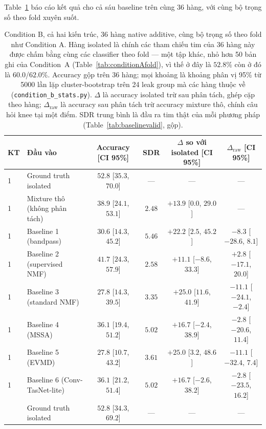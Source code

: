 \documentclass[11pt]{article}
\begin{document}
Table~\ref{tab:conditionb} báo cáo kết quả cho cả sáu baseline trên cùng
36 hàng, với cùng bộ trọng số theo fold xuyên suốt.

\begin{table}[H]
\centering
\caption{Condition B, cả hai kiến trúc, 36 hàng native additive, cùng bộ trọng số theo fold như Condition A. Hàng isolated là chính các tham chiếu tim của 36 hàng này được chấm bằng cùng các classifier theo fold --- một tập khác, nhỏ hơn 50 bản ghi của Condition~A (Table~\ref{tab:conditionAfold}), vì thế ở đây là $52.8\%$ còn ở đó là $60.0$/$62.0\%$. Accuracy gộp trên 36 hàng; mọi khoảng là khoảng phân vị 95\% từ 5000 lần lặp cluster-bootstrap trên 24 leak group mà các hàng thuộc về (\texttt{condition\_b\_stats.py}). $\Delta$ là accuracy isolated trừ sau phân tách, ghép cặp theo hàng; $\Delta_{\text{raw}}$ là accuracy sau phân tách trừ accuracy mixture thô, chính câu hỏi knee tại một điểm. SDR trung bình là đầu ra tim thật của mỗi phương pháp (Table~\ref{tab:baselinevalid}, gộp).}
\label{tab:conditionb}
\small
\begin{tabular}{@{}llcccc@{}}
\toprule
KT & Đầu vào & Accuracy [CI 95\%] & SDR & $\Delta$ so với isolated [CI 95\%] & $\Delta_{\text{raw}}$ [CI 95\%] \\
\midrule
1 & Ground truth isolated & $52.8$ [$35.3$, $70.0$] & --- & --- & --- \\
1 & Mixture thô (không phân tách) & $38.9$ [$24.1$, $53.1$] & $2.48$ & $+13.9$ [$0.0$, $29.0$] & --- \\
1 & Baseline 1 (bandpass) & $30.6$ [$14.3$, $45.2$] & $5.46$ & $+22.2$ [$2.5$, $45.2$] & $-8.3$ [$-28.6$, $8.1$] \\
1 & Baseline 2 (supervised NMF) & $41.7$ [$24.3$, $57.9$] & $2.58$ & $+11.1$ [$-8.6$, $33.3$] & $+2.8$ [$-17.1$, $20.0$] \\
1 & Baseline 3 (standard NMF) & $27.8$ [$14.3$, $39.5$] & $3.35$ & $+25.0$ [$11.6$, $41.9$] & $-11.1$ [$-24.1$, $-2.4$] \\
1 & Baseline 4 (MSSA) & $36.1$ [$19.4$, $51.2$] & $5.02$ & $+16.7$ [$-2.4$, $38.9$] & $-2.8$ [$-20.6$, $11.4$] \\
1 & Baseline 5 (EVMD) & $27.8$ [$10.7$, $43.2$] & $3.61$ & $+25.0$ [$3.2$, $48.6$] & $-11.1$ [$-32.4$, $7.4$] \\
1 & Baseline 6 (Conv-TasNet-lite) & $36.1$ [$21.2$, $51.4$] & $5.02$ & $+16.7$ [$-2.6$, $38.2$] & $-2.8$ [$-23.5$, $16.2$] \\
\addlinespace
2 & Ground truth isolated & $52.8$ [$34.3$, $69.2$] & --- & --- & --- \\

\end{tabular}
\end{table}
\end{document}
